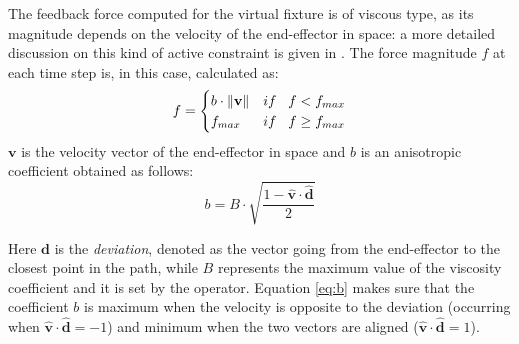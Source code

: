 \documentclass[conference]{IEEEtran}
\newcommand{\vers}[1]{\hat{\textbf{#1}}}
\newcommand{\vect}[1]{\textbf{#1}}
\newcommand{\norm}[1]{\left\lVert #1\right\rVert}
\begin{document}
    The feedback force computed for the virtual fixture is of viscous
    type, as its magnitude depends on the velocity of the end-effector in
    space: a more detailed discussion on this kind of active constraint is
    given in \cite{equations}. The force magnitude $f$ at each time step
    is, in this case, calculated as:
    \begin{equation}
        f = \begin{cases}
        b\cdot \norm{\vect{v}} & if \hspace{0.3cm}f<f_{max} \\
        f_{max} & if \hspace{0.3cm} f\geq f_{max}
        \end{cases}
        \label{eq:1}
    \end{equation}
    $\textbf{v}$ is the velocity vector of the end-effector in space and
    $b$ is an anisotropic coefficient obtained as follows:
    \begin{equation}
        b = B\cdot\sqrt{\frac{1-\vers{v}\cdot\vers{d}}{2}}
        \label{eq:b}
    \end{equation}

    Here $\textbf{d}$ is the \textit{deviation}, denoted as the vector
    going from the end-effector to the closest point in the path, while
    $B$ represents the maximum value of the viscosity coefficient and it
    is set by the operator. Equation \ref{eq:b} makes sure that the
    coefficient $b$ is maximum when the velocity is opposite to the
    deviation (occurring when $\hat{\textbf{v}}\cdot\hat{\textbf{d}}=-1$)
    and minimum when the two vectors are aligned
    ($\hat{\textbf{v}}\cdot\hat{\textbf{d}}=1$). 
\end{document}
